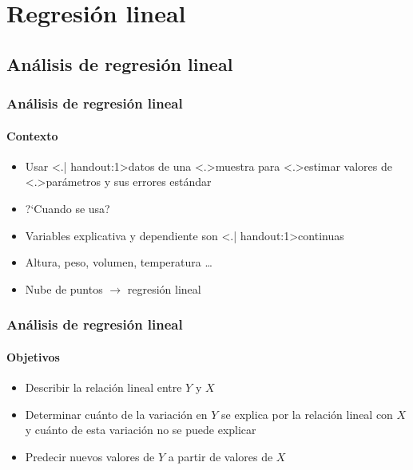 \documentclass[mathserif]{beamer}
\begin{document}
\section{Regresi\'on lineal}

\subsection[Regresi\'on]{An\'alisis de regresi\'on lineal}
 
\begin{frame}[label=linreg1]
   \frametitle{An\'alisis de regresi\'on lineal}
   \framesubtitle{Contexto}
    \begin{itemize}[<+- | visible@+-| handout:1>]
      \item Usar \structure<.| handout:1>{datos} de una \structure<.>{muestra} para \structure<.>{estimar} valores de \structure<.>{par\'ametros} y sus errores est\'andar
      \item ?`Cuando se usa?
      \item Variables explicativa y dependiente son \alert<.| handout:1>{continuas}
      \item Altura, peso, volumen, temperatura \ldots
      \item Nube de puntos $\rightarrow$ regresi\'on lineal
   \end{itemize}
\end{frame}%

 
\begin{frame}[label=linreg2]
   \frametitle{An\'alisis de regresi\'on lineal}
   \framesubtitle{Objetivos}
    \begin{itemize}[<+-| handout:1>]
      \item Describir la relaci\'on lineal entre $Y$ y $X$
      \item Determinar cu\'anto de la variaci\'on en $Y$ se explica por la relaci\'on lineal con $X$ y cu\'anto de esta variaci\'on no se puede explicar
      \item Predecir nuevos valores de $Y$ a partir de valores de $X$
   \end{itemize}
\end{frame}%
\end{document}
